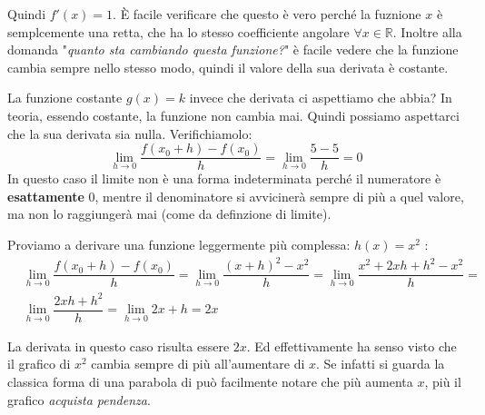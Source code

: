 Quindi $f'(x) = 1$. È facile verificare che questo è vero perché la fuznione $x$ è semplcemente una retta, che ha lo stesso coefficiente angolare $\forall x \in \mathbb{R}$. Inoltre alla domanda "\textit{quanto sta cambiando questa funzione?}" è facile vedere che la funzione cambia sempre nello stesso modo, quindi il valore della sua derivata è costante.

La funzione costante $g(x) = k$ invece che derivata ci aspettiamo che abbia? In teoria, essendo costante, la funzione non cambia mai. Quindi possiamo aspettarci che la sua derivata sia nulla. Verifichiamolo:
\begin{equation*}
	\lim_{h \to 0} \dfrac{f(x_0 + h) - f(x_0)}{h} = \lim_{h \to 0} \dfrac{5 - 5}{h} = 0
\end{equation*}
In questo caso il limite non è una forma indeterminata perché il numeratore è \textbf{esattamente} $0$, mentre il denominatore si avvicinerà sempre di più a quel valore, ma non lo raggiungerà mai (come da definzione di limite).

Proviamo a derivare una funzione leggermente più complessa: $h(x) = x^2$ :
\begin{align*}
	&\lim_{h \to 0} \dfrac{f(x_0 + h) - f(x_0)}{h} = \lim_{h \to 0} \dfrac{(x+h)^2 - x^2}{h} =  \lim_{h \to 0} \dfrac{x^2 +2 x h + h^2 - x^2}{h} =\\
	&\lim_{h \to 0} \dfrac{2xh + h^2}{h} = \lim_{h \to 0} 2x + h =  2x
\end{align*}

La derivata in questo caso risulta essere $2x$. Ed effettivamente ha senso visto che il grafico di $x^2$ cambia sempre di più all'aumentare di $x$. Se infatti si guarda la classica forma di una parabola di può facilmente notare che più aumenta $x$, più il grafico \textit{acquista pendenza}. %



